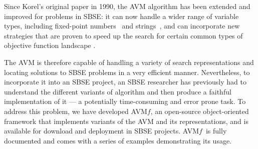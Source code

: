 \documentclass{llncs}
\newcommand{\name}{AVM\hspace{-1pt}$f$\xspace}
\begin{document}
Since Korel's original paper in 1990, the AVM algorithm has been extended and improved for problems in SBSE: it can now handle a wider range of variable types, including fixed-point numbers~\cite{Harman2007} and strings~\cite{McMinn2015}, and can incorporate new strategies that are proven to speed up the search for certain common types of objective function landscape
\cite{%
Kempka2015}.

The AVM is therefore capable of handling a variety of search representations and locating solutions to SBSE problems in a very efficient manner. Nevertheless, to incorporate it into an SBSE project, an SBSE researcher has previously had to understand the different variants of algorithm and then produce a faithful implementation of it --- a potentially time-consuming and error prone task. To address this problem, we have developed \name, an open-source object-oriented framework that implements variants of the AVM and its representations, and is available for download and deployment in SBSE projects. \name~is fully documented and comes with a series of examples demonstrating its usage.


\end{document}
